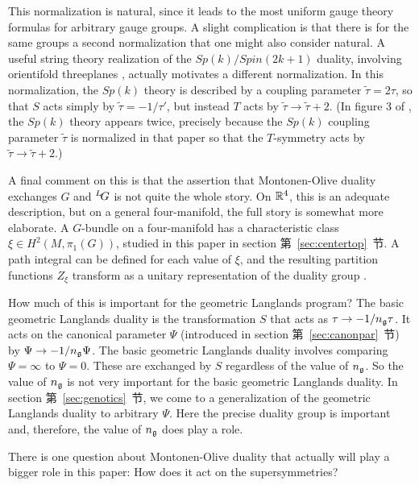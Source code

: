 This normalization is natural, since it leads to the most uniform
gauge theory formulas for arbitrary gauge groups. A slight
complication is that there is for the same groups a second
normalization that one might also consider natural.  A useful
string theory realization of the $Sp(k)/Spin(2k+1)$ duality,
involving orientifold threeplanes \cite{ref49}, actually
motivates a different normalization.  In this normalization, the
$Sp(k)$ theory is described by a coupling parameter
$\tilde\tau=2\tau$, so that $S$ acts simply by $\tilde \tau =
-1/\tau'$, but instead $T$ acts by $\tilde\tau\to \tilde \tau+2$.
(In figure 3 of \cite{ref49}, the $Sp(k)$ theory appears twice,
precisely because  the $Sp(k)$ coupling parameter $\tilde\tau$ is
normalized in that paper so that the $T$-symmetry acts by
$\tilde\tau\to\tilde\tau+2$.)

A final comment on this is that the assertion that Montonen-Olive
duality exchanges $G$ and $^L\negthinspace G$ is not quite the
whole story.  On $\Bbb{R}^4$, this is an adequate description, but
on a general four-manifold, the full story is somewhat more
elaborate.  A $G$-bundle on a four-manifold has a characteristic
class $\xi\in H^2(M,\pi_1(G))$, studied in this paper in section
第~\ref{sec:centertop}~节. A path integral can be defined for each value of
$\xi$, and the resulting partition functions $Z_\xi$ transform as
a unitary representation of the duality group
\cite{ref45,ref26}.

How much of this is important for the geometric Langlands program?
The basic geometric Langlands duality is the transformation $S$
that acts as $\tau\to -1/n_{\frak g}\tau$.  It acts on the
canonical parameter $\Psi$ (introduced in section 第~\ref{sec:canonpar}~节) by
$\Psi\to -1/n_{\frak g}\Psi$.  The basic geometric Langlands
duality involves comparing $\Psi=\infty$ to $\Psi=0$.  These are
exchanged by $S$ regardless of the value of $n_{\frak g}$.  So the
value of $n_{\frak g}$ is not very important for the basic
geometric Langlands duality.  In section 第~\ref{sec:genotics}~节, we come to a
generalization of the geometric Langlands duality to arbitrary
$\Psi$.  Here the precise duality group is important and,
therefore, the value of $n_{\frak g}$ does play a role.

\par{}

There is one question about Montonen-Olive duality that actually
will play a bigger role in this paper: How does it act on the
supersymmetries?

